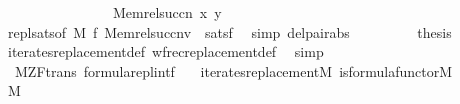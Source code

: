 \begin{isabellebody}
\ \ \ \ \ \ \ \ \ \ \ \ \ \ \ \ Memrel{\isacharparenleft}{\kern0pt}succ{\isacharparenleft}{\kern0pt}n{\isacharparenright}{\kern0pt}{\isacharparenright}{\kern0pt}{\isacharcomma}{\kern0pt}\ x{\isacharcomma}{\kern0pt}\ y{\isacharparenright}{\kern0pt}{\isacharparenright}{\kern0pt}{\isachardoublequoteclose}\isanewline
\ \ \ \ \ \ \isamarkupfalse%
\ repl{\isacharunderscore}{\kern0pt}sats{\isacharbrackleft}{\kern0pt}of\ M\ {\isacharquery}{\kern0pt}f\ {\isachardoublequoteopen}{\isacharbrackleft}{\kern0pt}Memrel{\isacharparenleft}{\kern0pt}succ{\isacharparenleft}{\kern0pt}n{\isacharparenright}{\kern0pt}{\isacharparenright}{\kern0pt}{\isacharcomma}{\kern0pt}v{\isacharbrackright}{\kern0pt}{\isachardoublequoteclose}{\isacharbrackright}{\kern0pt}\ \ satsf\ \isamarkupfalse%
\ {\isacharparenleft}{\kern0pt}simp\ del{\isacharcolon}{\kern0pt}pair{\isacharunderscore}{\kern0pt}abs{\isacharparenright}{\kern0pt}\isanewline
\ \ \isacommand{{\isacharbraceright}{\kern0pt}}\isamarkupfalse%
\isanewline
\ \ \isamarkupfalse%
\isanewline
\ \ \isamarkupfalse%
\ {\isacharquery}{\kern0pt}thesis\ \isamarkupfalse%
\ iterates{\isacharunderscore}{\kern0pt}replacement{\isacharunderscore}{\kern0pt}def\ wfrec{\isacharunderscore}{\kern0pt}replacement{\isacharunderscore}{\kern0pt}def\ \isamarkupfalse%
\ simp\isanewline
{}\isamarkupfalse%
%
\endisatagproof
{\isafoldproof}%
%
\isadelimproof
\isanewline
%
\endisadelimproof
\isanewline
{}\isamarkupfalse%
\ {\isacharparenleft}{\kern0pt}\ M{\isacharunderscore}{\kern0pt}ZF{\isacharunderscore}{\kern0pt}trans{\isacharparenright}{\kern0pt}\ formula{\isacharunderscore}{\kern0pt}repl{}{\isacharunderscore}{\kern0pt}intf\ {\isacharcolon}{\kern0pt}\isanewline
\ \ {\isachardoublequoteopen}iterates{\isacharunderscore}{\kern0pt}replacement{\isacharparenleft}{\kern0pt}{\isacharhash}{\kern0pt}{\isacharhash}{\kern0pt}M{\isacharcomma}{\kern0pt}\ is{\isacharunderscore}{\kern0pt}formula{\isacharunderscore}{\kern0pt}functor{\isacharparenleft}{\kern0pt}{\isacharhash}{\kern0pt}{\isacharhash}{\kern0pt}M{\isacharparenright}{\kern0pt}{\isacharcomma}{\kern0pt}\ {}{\isacharparenright}{\kern0pt}{\isachardoublequoteclose}\isanewline
%
\isadelimproof
%
\endisadelimproof
%
\isatagproof
{}\isamarkupfalse%
\ {\isacharminus}{\kern0pt}\isanewline
\ \ \isamarkupfalse%
\ {\isachardoublequoteopen}{}{\isasymin}M{\isachardoublequoteclose}\isanewline
\ \ \ \ \isamarkupfalse%

\end{isabellebody}

